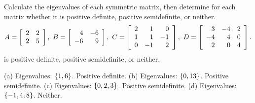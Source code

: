 \documentclass{ximera}
\begin{document}
\begin{exercise}
  Calculate the eigenvalues of each symmetric matrix, then determine
  for each matrix whether it is positive definite, positive
  semidefinite, or neither.
  \begin{equation*}
    A = \startmat{rr}
      2 & 2 \\
      2 & 5 \\
    \stopmat,\quad
    B = \startmat{rr}
      4  & -6 \\
      -6 &  9 \\
    \stopmat,\quad
    C = \startmat{rrr}
      2 &  1 &  0 \\
      1 &  1 & -1 \\
      0 & -1 &  2 \\
    \stopmat,\quad
    D = \startmat{rrr}
      3 & -4 &  2 \\
     -4 &  4 &  0 \\
      2 &  0 &  4 \\
    \stopmat.
  \end{equation*}
  is positive definite, positive semidefinite, or neither.
  \begin{solution}
    (a) Eigenvalues: $\set{1,6}$. Positive definite.
    (b) Eigenvalues: $\set{0,13}$. Positive semidefinite.
    (c) Eigenvalues: $\set{0,2,3}$. Positive semidefinite.
    (d) Eigenvalues: $\set{-1,4,8}$. Neither.
  \end{solution}
\end{exercise}
\end{document}
